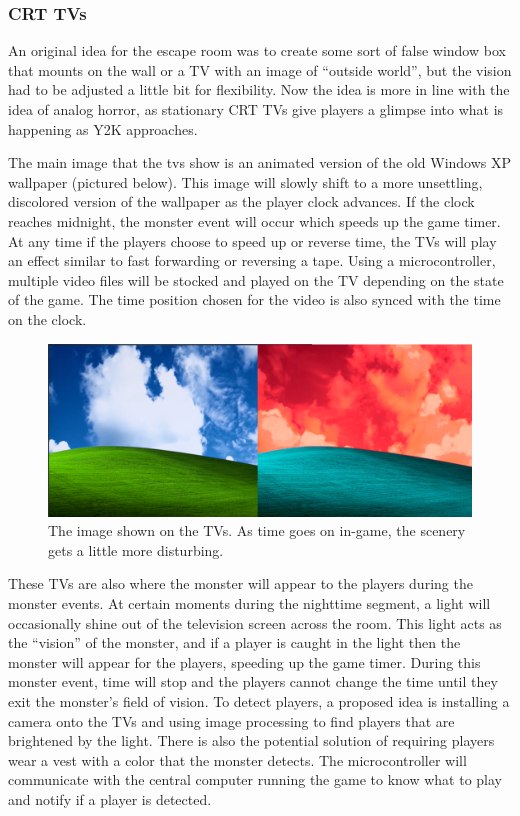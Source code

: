 \documentclass[conference]{IEEEtran}
\begin{document}
\subsubsection*{CRT TVs}
An original idea for the escape room was to create some sort of false window box that mounts on
the wall or a TV with an image of ``outside world'', but the vision had to be adjusted a little bit for flexibility.
Now the idea is more in line with the idea of analog horror, as stationary CRT TVs
give players a glimpse into what is happening as Y2K approaches.

The main image that the tvs show is an animated version of the old Windows XP wallpaper (pictured below).
This image will slowly shift to a more unsettling, discolored version of the wallpaper as the player clock advances. If the
clock reaches midnight, the monster event will occur which speeds up the game timer. At any time if the players
choose to speed up or reverse time, the TVs will play an effect similar to fast forwarding or reversing a tape.
Using a microcontroller, multiple video files will be stocked and played on the TV depending on the state of the
game. The time position chosen for the video is also synced with the time on the clock.

\begin{figure}[ht]
    \centering
    \includegraphics[width=0.90\columnwidth]{Images/tvcomparison.png}
    \caption{The image shown on the TVs. As time goes on in-game, the scenery
        gets a little more disturbing.}
\end{figure}

These TVs are also where the monster will appear to the players during the monster events. At certain moments
during the nighttime segment, a light will occasionally shine out of the television screen across the room. This light acts as
the ``vision'' of the monster, and if a player is caught in the light then the monster will appear for the players,
speeding up the game timer. During this monster event, time will stop and the players cannot change the
time until they exit the monster's field of vision. To detect players, a proposed idea is installing a camera
onto the TVs and using image processing to find players that are brightened by the light. There is also
the potential solution of requiring players wear a vest with a color that the monster detects. The microcontroller
will communicate with the central computer running the game to know what to play and notify if a player is detected.
\end{document}

